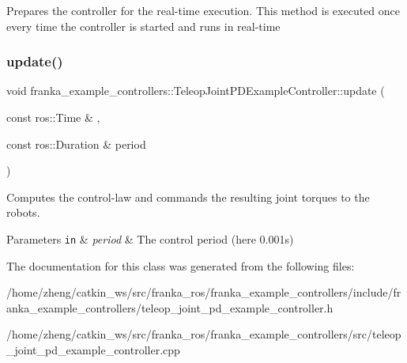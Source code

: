 Prepares the controller for the real-\/time execution. This method is executed once every time the controller is started and runs in real-\/time \mbox{\label{classfranka__example__controllers_1_1_teleop_joint_p_d_example_controller_ab40026839a17b639a2caddd20fd8d90f}} 
\subsubsection{\texorpdfstring{update()}{update()}}
{\footnotesize\ttfamily void franka\+\_\+example\+\_\+controllers\+::\+Teleop\+Joint\+P\+D\+Example\+Controller\+::update (\begin{DoxyParamCaption}\item[{const ros\+::\+Time \&}]{,  }\item[{const ros\+::\+Duration \&}]{period }\end{DoxyParamCaption})\hspace{0.3cm}{\ttfamily [override]}}

Computes the control-\/law and commands the resulting joint torques to the robots.


\begin{DoxyParams}[1]{Parameters}
\mbox{\tt in}  & {\em period} & The control period (here 0.\+001s) \\
\hline
\end{DoxyParams}


The documentation for this class was generated from the following files\+:\begin{DoxyCompactItemize}
\item 
/home/zheng/catkin\+\_\+ws/src/franka\+\_\+ros/franka\+\_\+example\+\_\+controllers/include/franka\+\_\+example\+\_\+controllers/teleop\+\_\+joint\+\_\+pd\+\_\+example\+\_\+controller.\+h\item 
/home/zheng/catkin\+\_\+ws/src/franka\+\_\+ros/franka\+\_\+example\+\_\+controllers/src/teleop\+\_\+joint\+\_\+pd\+\_\+example\+\_\+controller.\+cpp\end{DoxyCompactItemize}
